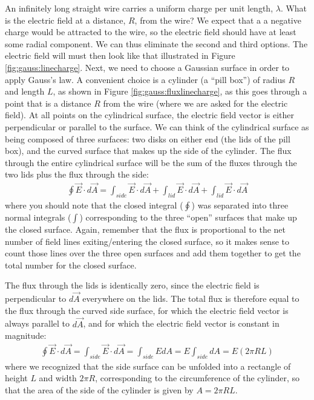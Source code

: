 \begin{example}{An infinitely long straight wire carries a uniform charge per unit length, $\lambda$. What is the electric field at a distance, $R$, from the wire?}
We expect that a a negative charge would be attracted to the wire, so the electric field should have at least some radial component. We can thus eliminate the second and third options. The electric field will must then look like that illustrated in Figure \ref{fig:gauss:linecharge}.
Next, we need to choose a Gaussian surface in order to apply Gauss's law. A convenient choice is a cylinder (a ``pill box'') of radius $R$ and length $L$, as shown in Figure \ref{fig:gauss:fluxlinecharge}, as this goes through a point that is a distance $R$ from the wire (where we are asked for the electric field). At all points on the cylindrical surface, the electric field vector is either perpendicular or parallel to the surface.
We can think of the cylindrical surface as being composed of three surfaces: two disks on either end (the lids of the pill box), and the curved surface that makes up the side of the cylinder. The flux through the entire cylindrical surface will be the sum of the fluxes through the two lids plus the flux through the side:
\begin{align*}
\oint \vec E\cdot d\vec A = \int_{side} \vec E\cdot d\vec A + \int_{lid}\vec E\cdot d\vec A + \int_{lid}\vec E\cdot d\vec A
\end{align*}
where you should note that the closed integral ($\oint$) was separated into three normal integrals ($\int$) corresponding to the three ``open'' surfaces that make up the closed surface. Again, remember that the flux is proportional to the net number of field lines exiting/entering the closed surface, so it makes sense to count those lines over the three open surfaces and add them together to get the total number for the closed surface.

The flux through the lids is identically zero, since the electric field is perpendicular to $d\vec A$ everywhere on the lids. The total flux is therefore equal to the flux through the curved side surface, for which the electric field vector is always parallel to $d\vec A$, and for which the electric field vector is constant in magnitude:
\begin{align*}
\oint \vec E\cdot d\vec A = \int_{side} \vec E\cdot d\vec A =\int_{side} EdA=E\int_{side}dA=E(2\pi R L)
\end{align*}
where we recognized that the side surface can be unfolded into a rectangle of height $L$ and width $2\pi R$, corresponding to the circumference of the cylinder, so that the area of the side of the cylinder is given by $A=2\pi R L$. 


\end{example}
